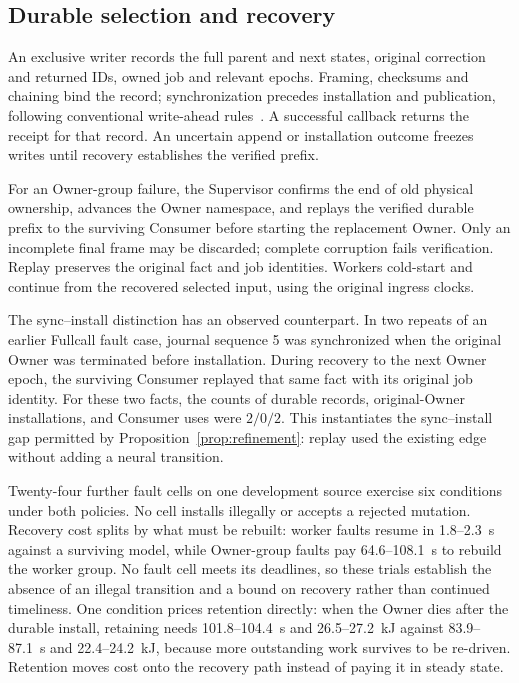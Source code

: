 \subsection{Durable selection and recovery}
An exclusive writer records the full parent and next states, original
correction and returned IDs, owned job and relevant epochs. Framing,
checksums and chaining bind the record; synchronization precedes
installation and publication, following conventional write-ahead
rules~\cite{mohan1992aries}. A successful callback returns the receipt for
that record. An uncertain append or installation outcome freezes writes
until recovery establishes the verified prefix.

\label{subsec:native_resilience}
For an Owner-group failure, the Supervisor confirms the end of old
physical ownership, advances the Owner namespace, and replays the verified
durable prefix to the surviving Consumer before starting the replacement
Owner. Only an incomplete final frame may be discarded; complete
corruption fails verification. Replay preserves the original fact and
job identities. Workers cold-start and continue from the recovered
selected input, using the original ingress clocks.

The sync--install distinction has an observed counterpart. In two repeats
of an earlier Fullcall fault case, journal sequence 5 was synchronized when
the original Owner was terminated before installation. During recovery
to the next Owner epoch, the surviving Consumer replayed that same fact
with its original job identity. For these two facts, the counts of
durable records, original-Owner installations, and Consumer uses were
$2/0/2$. This instantiates the sync--install gap permitted by
Proposition~\ref{prop:refinement}: replay used the existing edge without
adding a neural transition.

Twenty-four further fault cells on one development source exercise six
conditions under both policies. No cell installs illegally or accepts a
rejected mutation. Recovery cost splits by what must be rebuilt: worker
faults resume in 1.8--2.3~s against a surviving model, while Owner-group
faults pay 64.6--108.1~s to rebuild the worker group. No fault cell meets
its deadlines, so these trials establish the absence of an illegal
transition and a bound on recovery rather than continued timeliness. One
condition prices retention directly: when the Owner dies after the
durable install, retaining needs 101.8--104.4~s and 26.5--27.2~kJ against
83.9--87.1~s and 22.4--24.2~kJ, because more outstanding work survives to
be re-driven. Retention moves cost onto the recovery path instead of
paying it in steady state.

